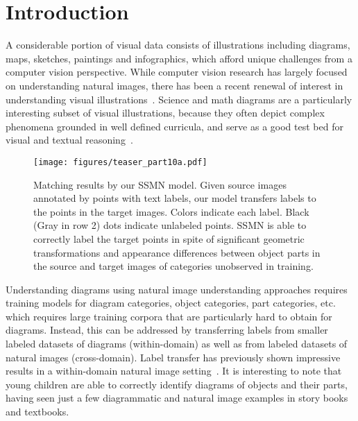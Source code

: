 \documentclass[10pt,twocolumn,letterpaper]{article}
\begin{document}
\section{Introduction}
\label{sec:intro}

A considerable portion of visual data consists of illustrations including diagrams, maps, sketches, paintings and infographics, which afford unique challenges from a computer vision perspective. While computer vision research has largely focused on understanding natural images, there has been a recent renewal of interest in understanding visual illustrations~\cite{Kembhavi2016ADI, Ouyang2016ForgetMeNotMF, Yu2016SketchMT, Wang2015Sketchbased3S, Yu2016SketchaNetAD, sketchy2016, Zhang2011CoupledIE, Liu2015Rent3DFP}. Science and math diagrams are a particularly interesting subset of visual illustrations, because they often depict complex phenomena grounded in well defined curricula, and serve as a good test bed for visual and textual reasoning~\cite{Kembhavi2016ADI, Seo2014DiagramUI, Seo2015SolvingGP, Krishnamurthy2016SemanticPT, Ghosh2017ContextualRF}.

\begin{figure}[t]
\centering
\texttt{[image: figures/teaser\_part10a.pdf]}
\caption{\small Matching results by our SSMN model. Given source images annotated by points with text labels, our model transfers labels to the points in the target images. Colors indicate each label. Black (Gray in row 2) dots indicate unlabeled points. SSMN is able to correctly label the target points in spite of significant geometric transformations and appearance differences between object parts in the source and target images of categories unobserved in training.}
\vspace{-1.5em}
\label{fig:intro}
\end{figure}

Understanding diagrams using natural image understanding approaches requires training models for diagram categories, object categories, part categories, etc. which requires large training corpora that are particularly hard to obtain for diagrams.  Instead, this can be addressed by transferring labels from smaller labeled datasets of diagrams (within-domain) as well as from labeled datasets of natural images (cross-domain). Label transfer has previously shown impressive results in a within-domain natural image setting~\cite{Liu2011NonparametricSP}. It is interesting to note that young children are able to correctly identify diagrams of objects and their parts, having seen just a few diagrammatic and natural image examples in story books and textbooks. 
\end{document}
